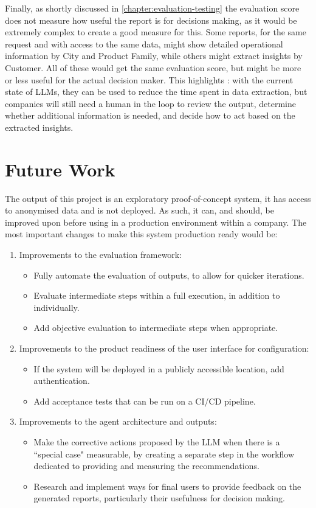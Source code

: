 \documentclass[a4paper]{report}
\begin{document}
Finally, as shortly discussed in \autoref{chapter:evaluation-testing} the evaluation score does not measure how useful the report is for decisions making, as it would be extremely complex to create a good measure for this. Some reports, for the same request and with access to the same data, might show detailed operational information by City and Product Family, while others might extract insights by Customer. All of these would get the same evaluation score, but might be more or less useful for the actual decision maker. This highlights \kfid : with the current state of LLMs, they can be used to reduce the time spent in data extraction, but companies will still need a human in the loop to review the output, determine whether additional information is needed, and decide how to act based on the extracted insights.

\section{Future Work}
\label{sec:future-work}

The output of this project is an exploratory proof-of-concept system, it has access to anonymised data and is not deployed. As such, it can, and should, be improved upon before using in a production environment within a company. The most important changes to make this system production ready would be:

\begin{enumerate}
    \item Improvements to the evaluation framework:
    \begin{itemize}
        \item Fully automate the evaluation of outputs, to allow for quicker iterations.
        \item Evaluate intermediate steps within a full execution, in addition to individually.
        \item Add objective evaluation to intermediate steps when appropriate.
    \end{itemize}
    \item Improvements to the product readiness of the user interface for configuration:
    \begin{itemize}
        \item If the system will be deployed in a publicly accessible location, add authentication.
        \item Add acceptance tests that can be run on a CI/CD pipeline.
    \end{itemize}
    \item Improvements to the agent architecture and outputs:
    \begin{itemize}
        \item Make the corrective actions proposed by the LLM when there is a ``special case" measurable, by creating a separate step in the workflow dedicated to providing and measuring the recommendations.
        \item Research and implement ways for final users to provide feedback on the generated reports, particularly their usefulness for decision making.
    \end{itemize}
\end{enumerate}
\end{document}
